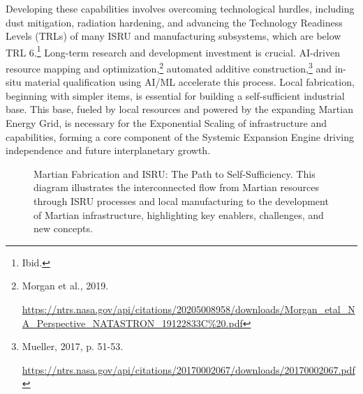 \documentclass[fontsize=10pt, oneside, DIV=calc]{scrartcl}
\begin{document}
\medskip

\noindent
Developing these capabilities involves overcoming technological hurdles, including dust mitigation, radiation hardening, and advancing the Technology Readiness Levels (TRLs) of many ISRU and manufacturing subsystems, which are below TRL 6.\footnote{Ibid.} Long-term research and development investment is crucial. AI-driven resource mapping and optimization,\footnote{Morgan et al., 2019. 







\href{https://ntrs.nasa.gov/api/citations/20205008958/downloads/Morgan\_etal\_NA\_Perspective\_NATASTRON\_19122833C\%20.pdf}{\url{https://ntrs.nasa.gov/api/citations/20205008958/downloads/Morgan\_etal\_NA\_Perspective\_NATASTRON\_19122833C\%20.pdf}}} automated additive construction,\footnote{Mueller, 2017, p. 51-53. 







\href{https://ntrs.nasa.gov/api/citations/20170002067/downloads/20170002067.pdf}{\url{https://ntrs.nasa.gov/api/citations/20170002067/downloads/20170002067.pdf}}} and in-situ material qualification using AI/ML accelerate this process. Local fabrication, beginning with simpler items, is essential for building a self-sufficient industrial base. This base, fueled by local resources and powered by the expanding Martian Energy Grid, is necessary for the Exponential Scaling of infrastructure and capabilities, forming a core component of the Systemic Expansion Engine driving independence and future interplanetary growth.



\begin{figure}[H]
  \centering
  \noindent
  \begin{minipage}{\textwidth}
    \centering
    \caption{Martian Fabrication and ISRU: The Path to Self-Sufficiency. This diagram illustrates the interconnected flow from Martian resources through ISRU processes and local manufacturing to the development of Martian infrastructure, highlighting key enablers, challenges, and new concepts.}
  \end{minipage}
\end{figure}
\end{document}
